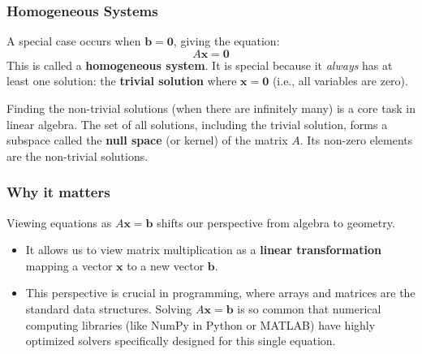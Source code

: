\subsubsection*{Homogeneous Systems}

A special case occurs when $\mathbf{b} = \mathbf{0}$, giving the equation:
\[ A\mathbf{x} = \mathbf{0} \]
This is called a \textbf{homogeneous system}. 
It is special because it \emph{always} has at least one solution: the \textbf{trivial solution} where $\mathbf{x} = \mathbf{0}$ (i.e., all variables are zero). 

Finding the non-trivial solutions (when there are infinitely many) is a core task in linear algebra. The set of all solutions, including the trivial solution, forms a subspace called the \textbf{null space} (or kernel) of the matrix $A$. Its non-zero elements are the non-trivial solutions.

\subsubsection*{Why it matters}
Viewing equations as $A\mathbf{x} = \mathbf{b}$ shifts our perspective from algebra to geometry. 
\begin{itemize}[leftmargin=*]
    \item It allows us to view matrix multiplication as a \textbf{linear transformation} mapping a vector $\mathbf{x}$ to a new vector $\mathbf{b}$. 
    \item This perspective is crucial in programming, where arrays and matrices are the standard data structures. Solving $A\mathbf{x} = \mathbf{b}$ is so common that numerical computing libraries (like NumPy in Python or MATLAB) have highly optimized solvers specifically designed for this single equation.
\end{itemize}
